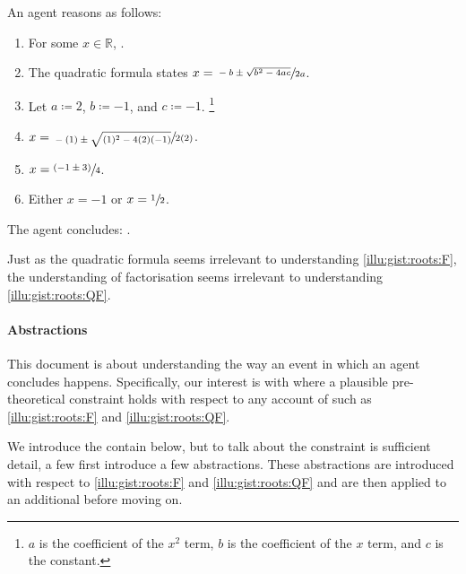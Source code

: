 \begin{note}
  \begin{scenario}%
    \label{illu:gist:roots:QF}%
    An agent reasons as follows:
    \begin{enumerate}[label=\arabic*., ref=\arabic*]
    \item
      \label{illu:gist:roots:QF:eq}
      For some \(x \in \mathbb{R}\), \rootsConEq{}.
    \item
      \label{illu:gist:roots:QF:qf}
      The quadratic formula states \(x = \sfrac{-b \pm \sqrt{b^{2} - 4ac}}{2a}\).
    \item
      \label{illu:gist:roots:QF:subs}
      Let \(a \coloneq 2\), \(b \coloneq -1\), and \(c \coloneq -1\).%
      \footnote{
        \(a\) is the coefficient of the \(x^{2}\) term, \(b\) is the coefficient of the \(x\) term, and \(c\) is the constant.
      }
    \item
      \label{illu:gist:roots:QF:qf-subs}
      \(x = \sfrac{-(1) \pm \sqrt{(1)^{2} - 4(2)(-1)}}{2(2)}\).
    \item
      \label{illu:gist:roots:QF:qf:1}
      \(x = \sfrac{(- 1 \pm 3)}{4}\).
    \item
      \label{illu:gist:roots:QF:qf:done}
      Either \(x = - 1\) or \(x = \sfrac{1}{2}\).
    \end{enumerate}
    The agent concludes:
    \rootsCon{}.
  \end{scenario}

  \noindent%
  Just as the quadratic formula seems irrelevant to understanding \autoref{illu:gist:roots:F}, the \agents{} understanding of factorisation seems irrelevant to understanding \autoref{illu:gist:roots:QF}.
\end{note}



\paragraph*{Abstractions}


\begin{note}
  This document is about understanding the way an event in which an agent concludes happens.
  Specifically, our interest is with where a plausible pre-theoretical constraint holds with respect to any account of  such as \autoref{illu:gist:roots:F} and \autoref{illu:gist:roots:QF}.

  We introduce the contain below, but to talk about the constraint is sufficient detail, a few first introduce a few abstractions.
  These abstractions are introduced with respect to  \ref{illu:gist:roots:F} and \ref{illu:gist:roots:QF} and are then applied to an additional \scen{} before moving on.
\end{note}


